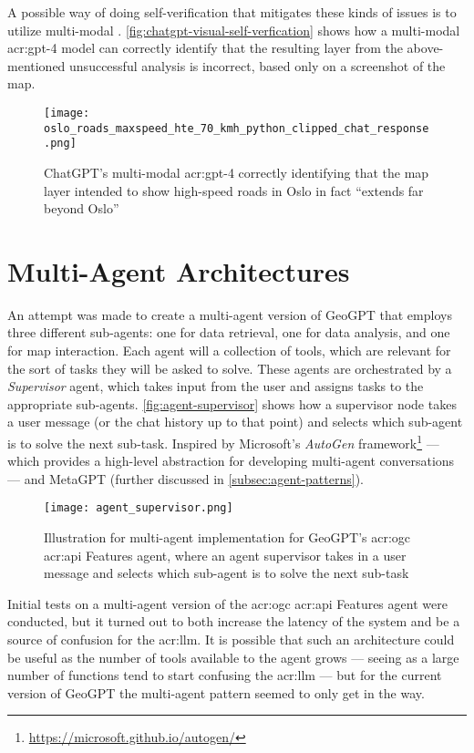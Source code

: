 A possible way of doing self-verification that mitigates these kinds of issues is to utilize multi-modal . \autoref{fig:chatgpt-visual-self-verfication} shows how a multi-modal \acrshort{acr:gpt}-4 model can correctly identify that the resulting layer from the above-mentioned unsuccessful analysis is incorrect, based only on a screenshot of the map.

\begin{figure}
    \centering
    \texttt{[image: oslo\_roads\_maxspeed\_hte\_70\_kmh\_python\_clipped\_chat\_response.png]}
    \caption[Using GPT-4 to identify errors in image of generated road map layer]{ChatGPT's multi-modal \acrshort{acr:gpt}-4 correctly identifying that the map layer intended to show high-speed roads in Oslo in fact \enquote{extends far beyond Oslo}}
    \label{fig:chatgpt-visual-self-verfication}
\end{figure}


\section{Multi-Agent Architectures}
\label{sec:multi-agent-architectures}

An attempt was made to create a multi-agent version of GeoGPT that employs three different sub-agents: one for data retrieval, one for data analysis, and one for map interaction. Each agent will a collection of tools, which are relevant for the sort of tasks they will be asked to solve. These agents are orchestrated by a \textit{Supervisor} agent, which takes input from the user and assigns tasks to the appropriate sub-agents. \autoref{fig:agent-supervisor} shows how a supervisor node takes a user message (or the chat history up to that point) and selects which sub-agent is to solve the next sub-task. Inspired by Microsoft's \textit{AutoGen} framework\footnote{\url{https://microsoft.github.io/autogen/}} --- which provides a high-level abstraction for developing multi-agent conversations --- and MetaGPT (further discussed in \autoref{subsec:agent-patterns}).

\begin{figure}
    \centering
    \texttt{[image: agent\_supervisor.png]}
    \caption[Architecture for multi-agent pattern implementation for GeoGPT's]{Illustration for multi-agent implementation for GeoGPT's \acrshort{acr:ogc} \acrshort{acr:api} Features agent, where an agent supervisor takes in a user message and selects which sub-agent is to solve the next sub-task}
    \label{fig:agent-supervisor}
\end{figure}

Initial tests on a multi-agent version of the \acrshort{acr:ogc} \acrshort{acr:api} Features agent were conducted, but it turned out to both increase the latency of the system and be a source of confusion for the \acrshort{acr:llm}. It is possible that such an architecture could be useful as the number of tools available to the agent grows --- seeing as a large number of functions tend to start confusing the \acrshort{acr:llm} --- but for the current version of GeoGPT the multi-agent pattern seemed to only get in the way.